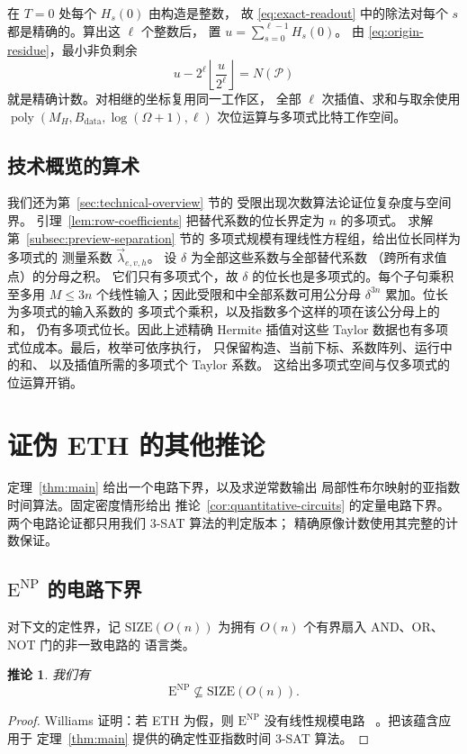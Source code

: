 \documentclass[11pt,reqno]{amsart}
\numberwithin{equation}{section}
\newtheorem{corollary}[theorem]{推论}
\theoremstyle{definition}\newtheorem{definition}[theorem]{定义}
\theoremstyle{remark}\newtheorem{remark}[theorem]{注}
\newcommand{\poly}{\operatorname{poly}}
\renewcommand{\le}{\leqslant}
\begin{document}
在 $T=0$ 处每个 $H_s(0)$ 由构造是整数，
故 \eqref{eq:exact-readout} 中的除法对每个 $s$
都是精确的。算出这 $\ell$ 个整数后，
置 $u=\sum_{s=0}^{\ell-1}H_s(0)$。
由 \eqref{eq:origin-residue}，最小非负剩余
\[
 u-2^\ell\left\lfloor\frac{u}{2^\ell}\right\rfloor=N(\mathcal P)
\]
就是精确计数。对相继的坐标复用同一工作区，
全部 $\ell$ 次插值、求和与取余使用
$\poly(M_H,B_{\mathrm{data}},\log(\Omega+1),\ell)$
次位运算与多项式比特工作空间。

\subsection{技术概览的算术}
\label{subsec:overview-arithmetic}
我们还为第~\ref{sec:technical-overview} 节的
受限出现次数算法论证位复杂度与空间界。
引理~\ref{lem:row-coefficients}
把替代系数的位长界定为 $n$ 的多项式。
求解第~\ref{subsec:preview-separation} 节的
多项式规模有理线性方程组，给出位长同样为多项式的
测量系数 $\vec\lambda_{e,v,h}$。
设 $\delta$ 为全部这些系数与全部替代系数
（跨所有求值点）的分母之积。
它们只有多项式个，故 $\delta$
的位长也是多项式的。每个子句乘积至多用 $M\le3n$
个线性输入；因此受限和中全部系数可用公分母
$\delta^{3n}$ 累加。位长为多项式的输入系数的
多项式个乘积，以及指数多个这样的项在该公分母上的和，
仍有多项式位长。因此上述精确 Hermite 插值对这些
Taylor 数据也有多项式位成本。最后，枚举可依序执行，
只保留构造、当前下标、系数阵列、运行中的和、
以及插值所需的多项式个 Taylor 系数。
这给出多项式空间与仅多项式的位运算开销。

\raggedbottom
\section{证伪 ETH 的其他推论}\label{app:consequences}
定理~\ref{thm:main} 给出一个电路下界，以及求逆常数输出
局部性布尔映射的亚指数时间算法。固定密度情形给出
推论~\ref{cor:quantitative-circuits} 的定量电路下界。
两个电路论证都只用我们 $3$-SAT 算法的判定版本；
精确原像计数使用其完整的计数保证。

\subsection{$\mathrm E^{\mathrm{NP}}$ 的电路下界}\label{subsec:circuit-lower-bounds}
对下文的定性界，记 $\mathrm{SIZE}(O(n))$
为拥有 $O(n)$ 个有界扇入 AND、OR、NOT 门的非一致电路的
语言类。

\begin{corollary}\label{cor:consequence-circuits}
我们有
\[
 \mathrm E^{\mathrm{NP}}\not\subseteq\mathrm{SIZE}(O(n)).
\]
\end{corollary}
\begin{proof}
Williams 证明：若 ETH 为假，则
$\mathrm E^{\mathrm{NP}}$ 没有线性规模电路
~\cite[Theorem~6.1]{Wil13}。把该蕴含应用于
定理~\ref{thm:main} 提供的确定性亚指数时间 $3$-SAT
算法。
\end{proof}
\end{document}
